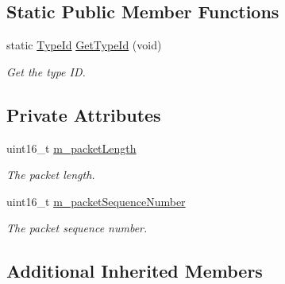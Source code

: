 \subsection*{Static Public Member Functions}
\begin{DoxyCompactItemize}
\item 
static \hyperlink{classns3_1_1TypeId}{Type\+Id} \hyperlink{classns3_1_1olsr_1_1PacketHeader_a764ee95a001c38de4dcbf0a8115da706}{Get\+Type\+Id} (void)
\begin{DoxyCompactList}\small\item\em Get the type ID. \end{DoxyCompactList}\end{DoxyCompactItemize}
\subsection*{Private Attributes}
\begin{DoxyCompactItemize}
\item 
uint16\+\_\+t \hyperlink{classns3_1_1olsr_1_1PacketHeader_aa3a9c586f89ea634d60824846a6e5c94}{m\+\_\+packet\+Length}
\begin{DoxyCompactList}\small\item\em The packet length. \end{DoxyCompactList}\item 
uint16\+\_\+t \hyperlink{classns3_1_1olsr_1_1PacketHeader_aba3c8769d2caacd2aa6e0ef8e2ad21ef}{m\+\_\+packet\+Sequence\+Number}
\begin{DoxyCompactList}\small\item\em The packet sequence number. \end{DoxyCompactList}\end{DoxyCompactItemize}
\subsection*{Additional Inherited Members}


